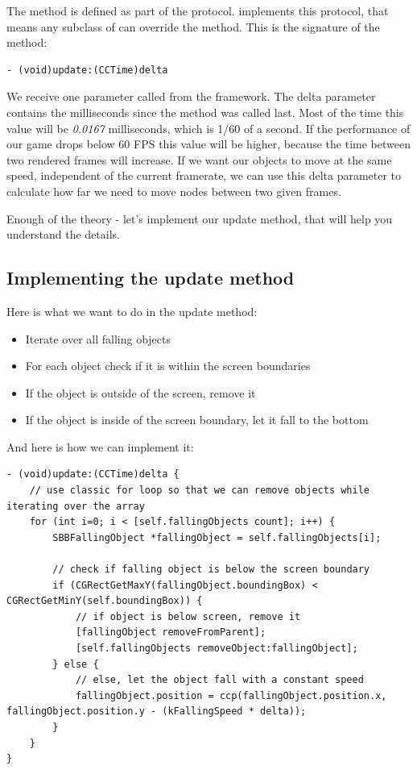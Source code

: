 The  method is defined as part of the
protocol.  implements this protocol, that means any subclass
of  can override the method. This is the signature of the
 method:
\begin{lstlisting}
- (void)update:(CCTime)delta
\end{lstlisting}
We receive one parameter called  from the \cocos{} framework.
The delta parameter contains the milliseconds since the 
method was called last. Most of the time this value will be \textit{0.0167}
milliseconds, which is 1/60 of a second. If the performance of our game drops
below 60 FPS this value will be higher, because the time between two rendered
frames will increase. If we want our objects to move at the same speed,
independent of the current framerate, we can use this delta parameter to
calculate how far we need to move nodes between two given frames.

Enough of the theory - let's implement our update method, that will help you
understand the details.

\subsection{Implementing the update method}
Here is what we want to do in the update method:

\begin{itemize}
  \item Iterate over all falling objects
  \item For each object check if it is within the screen boundaries
  \item If the object is outside of the screen, remove it
  \item If the object is inside of the screen boundary, let it fall to the
  bottom
\end{itemize}

And here is how we can implement it:

\begin{lstlisting}
- (void)update:(CCTime)delta {
    // use classic for loop so that we can remove objects while iterating over the array    
    for (int i=0; i < [self.fallingObjects count]; i++) {
        SBBFallingObject *fallingObject = self.fallingObjects[i];
        
        // check if falling object is below the screen boundary
        if (CGRectGetMaxY(fallingObject.boundingBox) < CGRectGetMinY(self.boundingBox)) {
            // if object is below screen, remove it
            [fallingObject removeFromParent];
            [self.fallingObjects removeObject:fallingObject];
        } else {
            // else, let the object fall with a constant speed
            fallingObject.position = ccp(fallingObject.position.x, fallingObject.position.y - (kFallingSpeed * delta));
        }
    }
}
\end{lstlisting}

